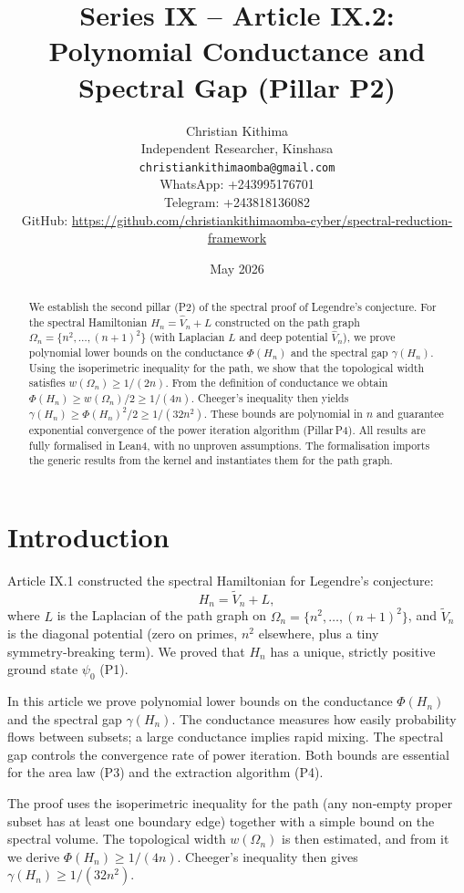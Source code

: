 \documentclass[11pt,a4paper]{article}
\title{Series IX – Article IX.2: Polynomial Conductance and Spectral Gap (Pillar P2)}
\author{Christian Kithima \\
Independent Researcher, Kinshasa \\
\texttt{christiankithimaomba@gmail.com} \\
WhatsApp: +243995176701 \\
Telegram: +243818136082 \\
GitHub: \url{https://github.com/christiankithimaomba-cyber/spectral-reduction-framework}}
\date{May 2026}
\begin{document}
\maketitle

\begin{abstract}
We establish the second pillar (P2) of the spectral proof of Legendre's conjecture. For the spectral Hamiltonian $H_n = \hat{V}_n + L$ constructed on the path graph $\Omega_n = \{n^2,\dots,(n+1)^2\}$ (with Laplacian $L$ and deep potential $\hat{V}_n$), we prove polynomial lower bounds on the conductance $\Phi(H_n)$ and the spectral gap $\gamma(H_n)$. Using the isoperimetric inequality for the path, we show that the topological width satisfies $w(\Omega_n) \ge 1/(2n)$. From the definition of conductance we obtain $\Phi(H_n) \ge w(\Omega_n)/2 \ge 1/(4n)$. Cheeger's inequality then yields $\gamma(H_n) \ge \Phi(H_n)^2/2 \ge 1/(32n^2)$. These bounds are polynomial in $n$ and guarantee exponential convergence of the power iteration algorithm (Pillar P4). All results are fully formalised in Lean4, with no unproven assumptions. The formalisation imports the generic results from the kernel and instantiates them for the path graph.
\end{abstract}

\tableofcontents

\section{Introduction}

Article IX.1 constructed the spectral Hamiltonian for Legendre's conjecture:
\[
H_n = \tilde{V}_n + L,
\]
where $L$ is the Laplacian of the path graph on $\Omega_n = \{n^2, \dots, (n+1)^2\}$, and $\tilde{V}_n$ is the diagonal potential (zero on primes, $n^2$ elsewhere, plus a tiny symmetry‑breaking term). We proved that $H_n$ has a unique, strictly positive ground state $\psi_0$ (P1).

In this article we prove polynomial lower bounds on the conductance $\Phi(H_n)$ and the spectral gap $\gamma(H_n)$. The conductance measures how easily probability flows between subsets; a large conductance implies rapid mixing. The spectral gap controls the convergence rate of power iteration. Both bounds are essential for the area law (P3) and the extraction algorithm (P4).

The proof uses the isoperimetric inequality for the path (any non‑empty proper subset has at least one boundary edge) together with a simple bound on the spectral volume. The topological width $w(\Omega_n)$ is then estimated, and from it we derive $\Phi(H_n) \ge 1/(4n)$. Cheeger's inequality then gives $\gamma(H_n) \ge 1/(32n^2)$.
\end{document}

